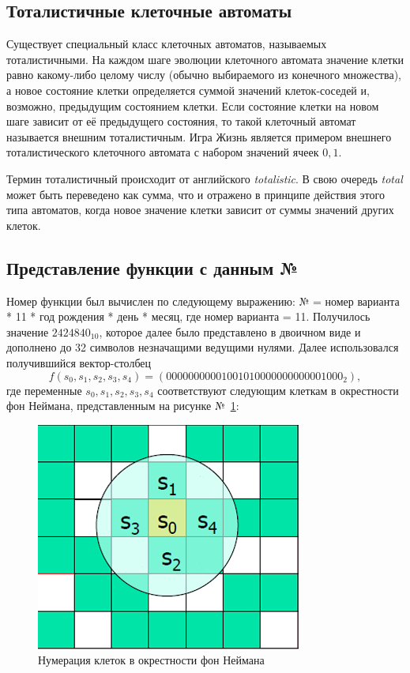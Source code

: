 \documentclass[a4paper, final]{article}
\begin{document}
\subsection{Тоталистичные клеточные автоматы}
Существует специальный класс клеточных автоматов, называемых тоталистичными. 
На каждом шаге эволюции клеточного автомата значение клетки равно какому-либо целому числу
(обычно выбираемого из конечного множества), а новое состояние клетки определяется суммой 
 значений клеток-соседей и, возможно, предыдущим состоянием клетки. Если состояние клетки на 
 новом шаге зависит от её предыдущего состояния, то такой клеточный автомат называется внешним 
 тоталистичным. Игра Жизнь является примером внешнего тоталистического клеточного автомата с 
 набором значений ячеек $0,1$.  

Термин тоталистичный происходит от английского \textit{totalistic}. В свою очередь 
\textit{total} может быть переведено как сумма, что и отражено в принципе действия этого 
типа автоматов, когда новое значение клетки зависит от суммы значений других клеток.

\subsection{Представление функции с данным №}
Номер функции был вычислен по следующему выражению: № = номер варианта * 11 * год рождения * день * месяц,
где номер варианта = 11. Получилось значение $2424840_{10}$, которое далее было представлено в двоичном
виде и дополнено до 32 символов незначащими ведущими нулями. Далее использовался  получившийся 
вектор-столбец 
$$f(s_0, s_1, s_2, s_3, s_4) = (00000000001001010000000000001000_2),$$
\noindent где переменные $s_0, s_1, s_2, s_3, s_4$ соответствуют следующим клеткам в окрестности 
фон Неймана, представленным на рисунке №~\ref{img:neyman_vars}:
\begin{figure}[H]
   \centering
   \includegraphics[scale=1]{neyman_vars.png}
   \caption{Нумерация клеток в окрестности фон Неймана}
   \label{img:neyman_vars}
\end{figure}
\end{document}
